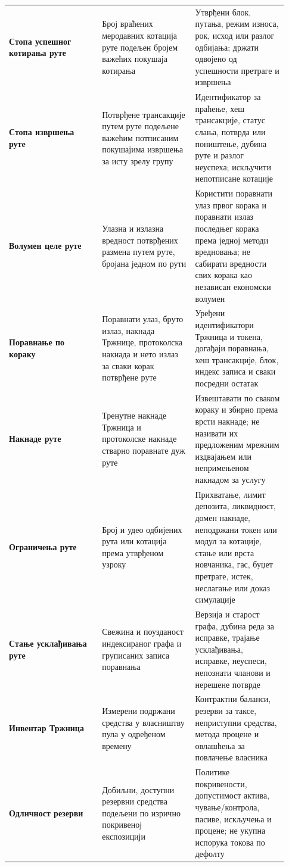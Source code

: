 \documentclass[11pt]{article}
\begin{document}
\begin{longtable}{P{0.31\linewidth} P{0.31\linewidth} P{0.31\linewidth}}
\textbf{Стопа успешног котирања руте} & Број враћених меродавних котација руте подељен бројем важећих покушаја котирања & Утврђени блок, путања, режим износа, рок, исход или разлог одбијања; држати одвојено од успешности претраге и извршења \\
\textbf{Стопа извршења руте} & Потврђене трансакције путем руте подељене важећим потписаним покушајима извршења за исту зрелу групу & Идентификатор за праћење, хеш трансакције, статус слања, потврда или поништење, дубина руте и разлог неуспеха; искључити непотписане котације \\
\textbf{Волумен целе руте} & Улазна и излазна вредност потврђених размена путем руте, бројана једном по рути & Користити поравнати улаз првог корака и поравнати излаз последњег корака према једној методи вредновања; не сабирати вредности свих корака као независан економски волумен \\
\textbf{Поравнање по кораку} & Поравнати улаз, бруто излаз, накнада Тржнице, протоколска накнада и нето излаз за сваки корак потврђене руте & Уређени идентификатори Тржница и токена, догађаји поравнања, хеш трансакције, блок, индекс записа и сваки посредни остатак \\
\textbf{Накнаде руте} & Тренутне накнаде Тржница и протоколске накнаде стварно поравнате дуж руте & Извештавати по сваком кораку и збирно према врсти накнаде; не називати их предложеним мрежним издвајањем или непримењеном накнадом за услугу \\
\textbf{Ограничења руте} & Број и удео одбијених рута или котација према утврђеном узроку & Прихватање, лимит депозита, ликвидност, домен накнаде, неподржани токен или модул за котације, стање или врста новчаника, гас, буџет претраге, истек, неслагање или доказ симулације \\
\textbf{Стање усклађивања руте} & Свежина и поузданост индексираног графа и груписаних записа поравнања & Верзија и старост графа, дубина реда за исправке, трајање усклађивања, исправке, неуспеси, непознати чланови и нерешене потврде \\
\textbf{Инвентар Тржница} & Измерени подржани средства у власништву пула у одређеном времену & Контрактни баланси, резерви за таксе, неприступни средства, метода процене и овлашћења за повлачење власника \\
\textbf{Одличност резерви} & Добиљни, доступни резервни средства подељени по изрично покривеној експозицији & Политике покривености, допустимост актива, чување/контрола, пасиве, искључења и процене; не укупна испорука токова по дефолту \\

\end{longtable}
\end{document}
